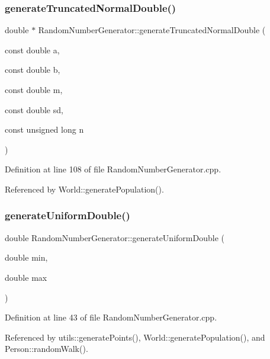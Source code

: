 \subsubsection{generateTruncatedNormalDouble()}
{\footnotesize\ttfamily double $\ast$ Random\+Number\+Generator\+::generate\+Truncated\+Normal\+Double (\begin{DoxyParamCaption}\item[{const double}]{a,  }\item[{const double}]{b,  }\item[{const double}]{m,  }\item[{const double}]{sd,  }\item[{const unsigned long}]{n }\end{DoxyParamCaption})}



Definition at line 108 of file Random\+Number\+Generator.\+cpp.



Referenced by World\+::generate\+Population().

\mbox{\label{class_random_number_generator_ad89bab678dc9b098440aba4b0d15967f}} 
\subsubsection{generateUniformDouble()\hspace{0.1cm}{\footnotesize\ttfamily [1/2]}}
{\footnotesize\ttfamily double Random\+Number\+Generator\+::generate\+Uniform\+Double (\begin{DoxyParamCaption}\item[{double}]{min,  }\item[{double}]{max }\end{DoxyParamCaption})}



Definition at line 43 of file Random\+Number\+Generator.\+cpp.



Referenced by utils\+::generate\+Points(), World\+::generate\+Population(), and Person\+::random\+Walk().

\mbox{\label{class_random_number_generator_a335940c67220ca20da3401be59b22808}} 

